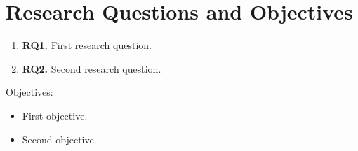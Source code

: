 \section{Research Questions and Objectives}
\label{sec:intro-objectives}


\begin{enumerate}
  \item \textbf{RQ1.} First research question.
  \item \textbf{RQ2.} Second research question.
\end{enumerate}

\noindent Objectives:
\begin{itemize}
  \item First objective.
  \item Second objective.
\end{itemize}
